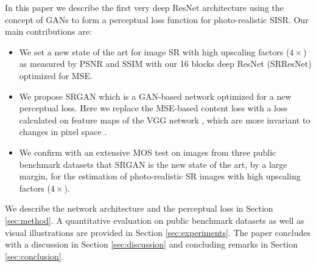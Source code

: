 \documentclass[10pt,twocolumn,letterpaper]{article}
\begin{document}
In this paper we describe the first very deep \ac{ResNet} \cite{he2015deep,he2016identity} architecture using the concept of \acp{GAN} to form a perceptual loss function for photo-realistic \ac{SISR}. Our main contributions are:
\begin{itemize}
\item We set a new state of the art for image \ac{SR} with high upscaling factors ($4\times$) as measured by \ac{PSNR} and \ac{SSIM} with our 16 blocks deep \ac{ResNet} (SRResNet) optimized for \ac{MSE}. %
\item We propose SRGAN which is a \ac{GAN}-based network optimized for a new perceptual loss. Here we replace the \ac{MSE}-based content loss with a loss calculated on feature maps of the VGG network \cite{simonyan2014very}, which are more invariant to changes in pixel space \cite{Li2016}. %
\item We confirm with an extensive \ac{MOS} test on images from three public benchmark datasets that SRGAN is the new state of the art, by a large margin, for the estimation of photo-realistic \ac{SR} images with high upscaling factors ($4\times$).
\end{itemize}


We describe the network architecture and the perceptual loss in Section \ref{sec:method}. A quantitative evaluation on public benchmark datasets as well as visual illustrations are provided in Section \ref{sec:experiments}. The paper concludes with a discussion in Section \ref{sec:discussion} and concluding remarks in Section \ref{sec:conclusion}.
\end{document}
